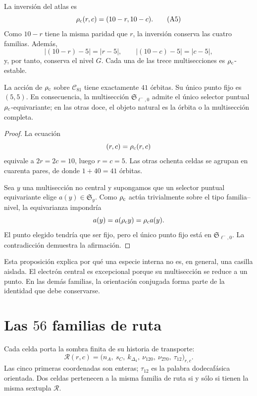 La inversión del atlas es
\[
 \rho_{\rm c}(r,c)=(10-r,10-c).
 \tag{A5}\label{eq:inversion-central-atlas-rev6}
\]
Como \(10-r\) tiene la misma paridad que \(r\), la inversión conserva las
cuatro familias.  Además,
\[
 |(10-r)-5|=|r-5|,
 \qquad
 |(10-c)-5|=|c-5|,
\]
y, por tanto, conserva el nivel \(G\).  Cada una de las trece
multisecciones es \(\rho_{\rm c}\)-estable.

\begin{proposition}
\label{prop:orbitas-centro-atlas-rev6}
La acción de \(\rho_{\rm c}\) sobre \(\mathcal C_{81}\) tiene exactamente
\(41\) órbitas.  Su único punto fijo es \((5,5)\).  En consecuencia, la
multisección \(\mathfrak S_{\ell^-,0}\) admite el único selector puntual
\(\rho_{\rm c}\)-equivariante; en las otras doce, el objeto natural es la
órbita o la multisección completa.
\end{proposition}

\begin{proof}
La ecuación
\[
 (r,c)=\rho_{\rm c}(r,c)
\]
equivale a \(2r=2c=10\), luego \(r=c=5\).  Las otras ochenta celdas se
agrupan en cuarenta pares, de donde \(1+40=41\) órbitas.

Sea \(y\) una multisección no central y supongamos que un selector puntual
equivariante elige \(a(y)\in\mathfrak S_y\).  Como \(\rho_{\rm c}\) actúa
trivialmente sobre el tipo familia--nivel, la equivarianza impondría
\[
 a(y)=a(\rho_{\rm c}y)=\rho_{\rm c}a(y).
\]
El punto elegido tendría que ser fijo, pero el único punto fijo está en
\(\mathfrak S_{\ell^-,0}\).  La contradicción demuestra la afirmación.
\end{proof}

Esta proposición explica por qué una especie interna no es, en general, una
casilla aislada.  El electrón central es excepcional porque su multisección
se reduce a un punto.  En las demás familias, la orientación conjugada forma
parte de la identidad que debe conservarse.

\section{Las \(56\) familias de ruta}

Cada celda porta la sombra finita de su historia de transporte:
\[
 \mathcal R(r,c)=
 \bigl(
 n_A,\ s_C,\ k_{\Delta_4},\
 \nu_{120},\ \nu_{270},\ \tau_{12}
 \bigr)_{r,c}.
 \tag{A6}\label{eq:lector-familia-ruta-atlas}
\]
Las cinco primeras coordenadas son enteras; \(\tau_{12}\) es la palabra
dodecafásica orientada.  Dos celdas pertenecen a la misma familia de ruta
si y sólo si tienen la misma sextupla \(\mathcal R\).

